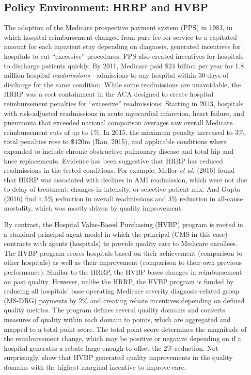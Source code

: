 \documentclass[12pt]{article}
\begin{document}
\subsection{Policy Environment: HRRP and HVBP}
The adoption of the Medicare prospective payment system (PPS) in 1983, in which hospital reimbursement changed from pure fee-for-service to a capitated amount for each inpatient stay depending on diagnosis, generated incentives for hospitals to cut ``excessive'' procedures. PPS also created incentives for hospitals to discharge patients quickly.  By 2011, Medicare paid $\$$24 billion per year for 1.8 million hospital \textit{readmissions} - admissions to any hospital within 30-days of discharge for the same condition.  While some readmissions are unavoidable, the HRRP was a cost containment in the ACA designed to create hospital reimbursement penalties for ``excessive'' readmissions.  Starting in 2013, hospitals with risk-adjusted readmissions in acute myocardial infarction, heart failure, and pneumonia that exceeded national comparison averages saw overall Medicare reimbursement cuts of up to 1$\%$.   In 2015, the maximum penalty increased to 3$\%$, total penalties rose to $\$$420m (Rau, 2015), and applicable conditions where expanded to include chronic obstructive pulmonary disease and total hip and knee replacements.  Evidence has been suggestive that HRRP has reduced readmissions in the tested conditions.  For example, Mellor \textit{et al.} (2016) found that HRRP was associated with declines in AMI readmission, which were not due to delay of treatment, changes in intensity, or selective patient mix. And Gupta (2016) find a 5$\%$ reduction in overall readmissions and 3$\%$ reduction in all-cause mortality, which was mostly driven by quality improvement.

By contrast, the Hospital Value-Based Purchasing (HVBP) program is rooted in a standard principal-agent model in which the principal (CMS in this case) contracts with agents (hospitals) to provide quality care to Medicare enrollees. The HVBP program scores hospitals based on their achievement (comparison to other hospitals) as well as their improvement (comparison to their own previous performance).  Similar to the HRRP, the HVBP bases changes in reimbursement on past quality.  However, unlike the HRRP, the HVBP program is funded by reducing all hospitals' base operating Medicare severity diagnosis-related group (MS-DRG) payments by 2$\%$ and creating rebate incentives depending on defined quality metrics.  The program defines several quality domains and converts measures of quality within each domain to points, which are aggregated and mapped to a total point score.  The total point score determines the magnitude of the reimbursement change, which may be positive or negative depending on if a hospital generates a rebate large enough to offset the 2$\%$ reduction.  Not surprisingly, \cite{norton2016} show that HVBP generated quality improvements in the quality domains with the highest marginal incentive to improve care.  
\end{document}
